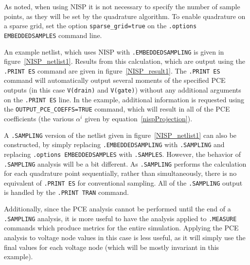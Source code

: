As noted, when using NISP it is not necessary to specify the number of sample points, as they will
be set by the quadrature algorithm.  To enable quadrature on a sparse grid, set the 
option \texttt{sparse\_grid=true} on the \texttt{.options EMBEDDEDSAMPLES} command line.

An example netlist, which uses NISP with \texttt{.EMBEDDEDSAMPLING} is given in figure~\ref{NISP_netlist1}.  
Results from this calculation, which are output using the \texttt{.PRINT ES} command 
are given in figure~\ref{NISP_result1}.  The \texttt{.PRINT ES} command 
will automatically output several moments of the specified PCE outputs (in this 
case \texttt{V(drain)} and \texttt{V(gate)}) without any additional arguments 
on the \texttt{.PRINT ES} line.  In the example, additional information is 
requested using the \texttt{OUTPUT\_PCE\_COEFFS=TRUE} command, which will result 
in all of the PCE coefficients (the various $\alpha^{i}$ given by equation~\ref{nispProjection}).

A \texttt{.SAMPLING} version of the netlist given in figure~\ref{NISP_netlist1} can also be 
constructed, by simply replacing \texttt{.EMBEDDEDSAMPLING} with \texttt{.SAMPLING} and 
replacing \texttt{.options EMBEDDEDSAMPLES} with \texttt{.SAMPLES}.    However, the behavior
of \texttt{.SAMPLING} analysis will be a bit different.  As \texttt{.SAMPLING} 
performs the calculation for each quadrature point sequentially, rather than 
simultaneously, there is no equivalent of \texttt{.PRINT ES} for 
conventional sampling.  All of the \texttt{.SAMPLING} output is handled 
by the \texttt{.PRINT TRAN} command.  

Additionally, since the PCE analysis cannot be performed until the end of a 
\texttt{.SAMPLING} analysis, it is more  useful to have the analysis applied 
to \texttt{.MEASURE} commands which produce metrics for the entire simulation.  
Applying the PCE analysis to voltage node values in this case is less useful, 
as it will  simply use the final values for each voltage node (which will be 
mostly invariant in this example).

